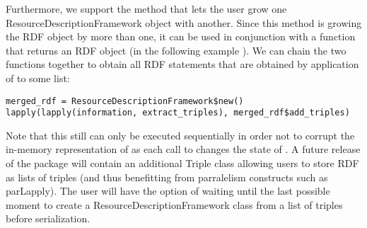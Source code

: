 Furthermore, we support the  method that lets the user grow one ResourceDescriptionFramework object with another. Since this method is growing the RDF object by more than one, it can be used in conjunction with a function that returns an RDF object (in the following example ). We can chain the two functions together to obtain all RDF statements that are obtained by application of  to some list:
\begin{lstlisting}[style=customr]
merged_rdf = ResourceDescriptionFramework$new()
lapply(lapply(information, extract_triples), merged_rdf$add_triples)
\end{lstlisting}

Note that this still can only be executed sequentially in order not to corrupt the in-memory representation of  as each call to  changes the state of . A future release of the package will contain an additional Triple class allowing users to store RDF as lists of triples (and thus benefitting from parralelism constructs such as parLapply). The user will have the option of waiting until the last possible moment to create a ResourceDescriptionFramework class from a list of triples before serialization.